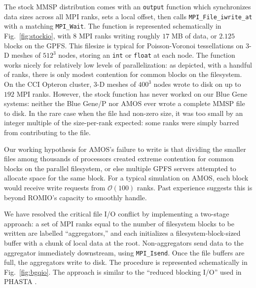 \documentclass[11pt]{article}
\begin{document}
\begin{multicols*}{2}
The stock MMSP distribution comes with an \texttt{output} function which synchronizes data sizes across all MPI ranks, sets a local offset, then calls \texttt{MPI\_File\_iwrite\_at} with a matching \texttt{MPI\_Wait}.
The function is represented schematically in Fig.~\ref{fig:stockio}, with $8$ MPI ranks writing roughly $17$ MB of data, or $2.125$ blocks on the GPFS.
This filesize is typical for Poisson-Voronoi tessellations on 3-D meshes of $512^3$ nodes, storing an \texttt{int} or \texttt{float} at each node.
The function works nicely for relatively low levels of parallelization:
as depicted, with a handful of ranks, there is only modest contention for common blocks on the filesystem.
On the CCI Opteron cluster, 3-D meshes of $400^3$ nodes wrote to disk on up to $192$ MPI ranks.
However, the stock function has never worked on our Blue Gene systems:
neither the Blue Gene/P nor AMOS ever wrote a complete MMSP file to disk.
In the rare case when the file had non-zero size, it was too small by an integer multiple of the size-per-rank expected:
some ranks were simply barred from contributing to the file.

Our working hypothesis for AMOS's failure to write is that dividing the smaller files among thousands of processors created extreme contention for common blocks on the parallel filesystem, or else multiple GPFS servers attempted to allocate space for the same block.
For a typical simulation on AMOS, each block would receive write requests from $\mathcal{O}(100)$ ranks.
Past experience suggests this is beyond ROMIO's capacity to smoothly handle.

We have resolved the critical file I/O conflict by implementing a two-stage approach:
a set of MPI ranks equal to the number of filesystem blocks to be written are labelled ``aggregators,'' and each initializes a filesystem-block-sized buffer with a chunk of local data at the root.
Non-aggregators send data to the aggregator immediately downstream, using \texttt{MPI\_Isend}.
Once the file buffers are full, the aggregators write to disk.
The procedure is represented schematically in Fig.~\ref{fig:bgqio}.
The approach is similar to the ``reduced blocking I/O'' used in PHASTA \cite{Carothers2010,Carothers2011}.



\end{multicols*}
\end{document}
